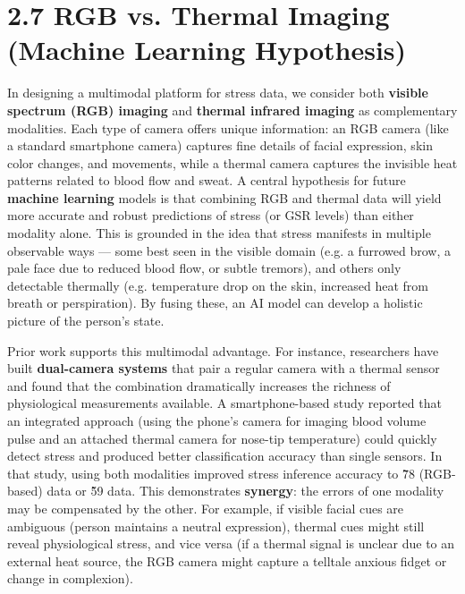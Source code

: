 \section{2.7 RGB vs. Thermal Imaging (Machine Learning Hypothesis)}

In designing a multimodal platform for stress data, we consider both
\textbf{visible spectrum (RGB) imaging} and \textbf{thermal infrared imaging} as
complementary modalities. Each type of camera offers unique information:
an RGB camera (like a standard smartphone camera) captures fine details
of facial expression, skin color changes, and movements, while a thermal
camera captures the invisible heat patterns related to blood flow and
sweat. A central hypothesis for future \textbf{machine learning} models is
that combining RGB and thermal data will yield more accurate and robust
predictions of stress (or GSR levels) than either modality alone. This
is grounded in the idea that stress manifests in multiple observable
ways --- some best seen in the visible domain (e.g. a furrowed brow, a
pale face due to reduced blood flow, or subtle tremors), and others only
detectable thermally (e.g. temperature drop on the skin, increased heat
from breath or perspiration). By fusing these, an AI model can develop a
holistic picture of the person's state.

Prior work supports this multimodal advantage. For instance, researchers
have built \textbf{dual-camera systems} that pair a regular camera with a
thermal sensor and found that the combination dramatically increases the
richness of physiological measurements
available\cite{InstantStressSmartphone2019}.
A smartphone-based study reported that an integrated approach (using the
phone's camera for imaging blood volume pulse and an attached thermal
camera for nose-tip temperature) could quickly detect stress and
produced better classification accuracy than single
sensors\cite{InstantStressSmartphone2019}\cite{InstantStressSmartphone2019}.
In that study, using both modalities improved stress inference accuracy
to \~78%
(RGB-based) data or \~59%
data\cite{InstantStressSmartphone2019}.
This demonstrates \textbf{synergy}: the errors of one modality may be
compensated by the other. For example, if visible facial cues are
ambiguous (person maintains a neutral expression), thermal cues might
still reveal physiological stress, and vice versa (if a thermal signal
is unclear due to an external heat source, the RGB camera might capture
a telltale anxious fidget or change in complexion).


